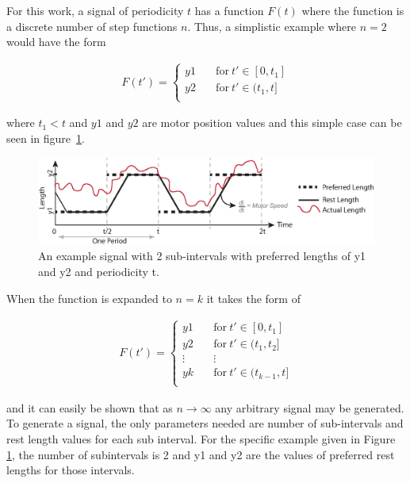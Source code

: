 For this work, a signal of periodicity \(t\) has a function \(F(t)\) where the function is a discrete number of step functions \(n\).
Thus, a simplistic example where \(n = 2\) would have the form

\begin{align}
F(t') =
  \begin{cases}
    y1       & \quad \text{for}~ t' \in [0, t_{1}]\\
    y2       & \quad \text{for}~ t' \in (t_{1}, t]\\
  \end{cases}
\end{align}

where \(t_{1} < t\) and \(y1\) and \(y2\) are motor position values and this simple case can be seen in figure~\ref{fig:signal}.

\begin{figure}[t]
\centering
\includegraphics[width=\columnwidth]{tex/ASME-journal/fig/signal.eps}
\caption{An example signal with 2 sub-intervals with preferred lengths of y1 and y2 and periodicity t.}
\label{fig:signal}
\end{figure}

When the function is expanded to \(n = k\) it takes the form of

\begin{align}
F(t') =
  \begin{cases}
    y1       & \quad \text{for}~ t' \in [0, t_{1}]\\
    y2       & \quad \text{for}~ t' \in (t_{1}, t_{2}]\\
    \vdots   & \quad \vdots \\
    yk       & \quad \text{for}~ t' \in (t_{k-1}, t]\\
  \end{cases}
\end{align}

and it can easily be shown that as \(n \to \infty\) any arbitrary signal may be generated.
To generate a signal, the only parameters needed are number of sub-intervals and rest length values for each sub interval. 
For the specific example given in Figure \ref{fig:signal}, the number of subintervals is 2 and y1 and y2 are the values of preferred rest lengths for those intervals. 

